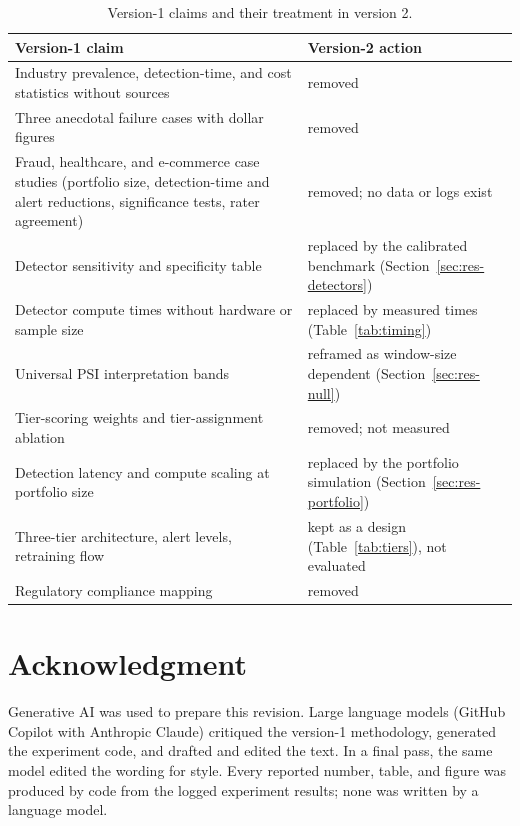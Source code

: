 \documentclass[journal]{IEEEtran}
\begin{document}
\begin{table}[!t]
\caption{Version-1 claims and their treatment in version 2.}
\label{tab:v1}
\centering
\footnotesize
\setlength{\tabcolsep}{3pt}
\renewcommand{\arraystretch}{1.15}
\begin{tabular}{>{\raggedright\arraybackslash}p{4.6cm}>{\raggedright\arraybackslash}p{3.3cm}}
\toprule
Version-1 claim & Version-2 action \\
\midrule
Industry prevalence, detection-time, and cost statistics without sources & removed \\
Three anecdotal failure cases with dollar figures & removed \\
Fraud, healthcare, and e-commerce case studies (portfolio size, detection-time and alert reductions, significance tests, rater agreement) & removed; no data or logs exist \\
Detector sensitivity and specificity table & replaced by the calibrated benchmark (Section~\ref{sec:res-detectors}) \\
Detector compute times without hardware or sample size & replaced by measured times (Table~\ref{tab:timing}) \\
Universal PSI interpretation bands & reframed as window-size dependent (Section~\ref{sec:res-null}) \\
Tier-scoring weights and tier-assignment ablation & removed; not measured \\
Detection latency and compute scaling at portfolio size & replaced by the portfolio simulation (Section~\ref{sec:res-portfolio}) \\
Three-tier architecture, alert levels, retraining flow & kept as a design (Table~\ref{tab:tiers}), not evaluated \\
Regulatory compliance mapping & removed \\
\bottomrule
\end{tabular}
\end{table}

\section*{Acknowledgment}
Generative AI was used to prepare this revision. Large language models (GitHub Copilot with Anthropic Claude) critiqued the version-1 methodology, generated the experiment code, and drafted and edited the text. In a final pass, the same model edited the wording for style. Every reported number, table, and figure was produced by code from the logged experiment results; none was written by a language model.



\end{document}
